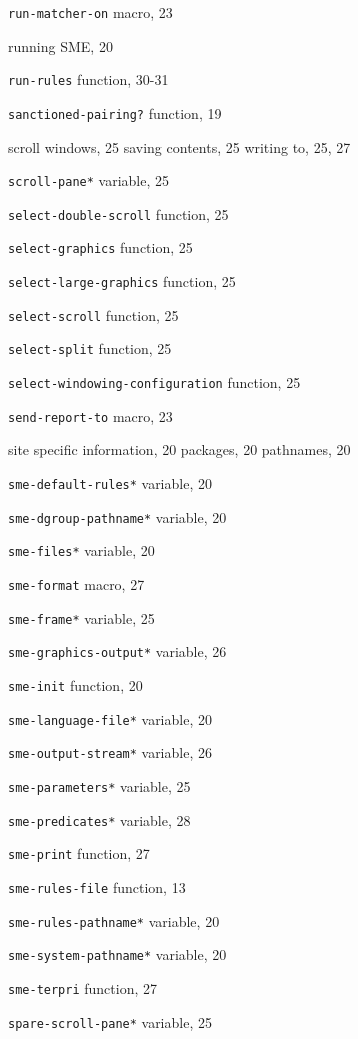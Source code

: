 \begin{theindex}
\item {\tt run-matcher-on} macro, 23
\item running SME, 20
\item {\tt run-rules} function, 30-31
\indexspace
\item {\tt sanctioned-pairing?} function, 19
\item scroll windows, 25
	\subitem  saving contents, 25
	\subitem  writing to, 25, 27
\item {\tt *scroll-pane*} variable, 25
\item {\tt select-double-scroll} function, 25
\item {\tt select-graphics} function, 25
\item {\tt select-large-graphics} function, 25
\item {\tt select-scroll} function, 25
\item {\tt select-split} function, 25
\item {\tt select-windowing-configuration} function, 25
\item {\tt send-report-to} macro, 23
\item site specific information, 20
	\subitem  packages, 20
	\subitem  pathnames, 20
\item {\tt *sme-default-rules*} variable, 20
\item {\tt *sme-dgroup-pathname*} variable, 20
\item {\tt *sme-files*} variable, 20
\item {\tt sme-format} macro, 27
\item {\tt *sme-frame*} variable, 25
\item {\tt *sme-graphics-output*} variable, 26
\item {\tt sme-init} function, 20
\item {\tt *sme-language-file*} variable, 20
\item {\tt *sme-output-stream*} variable, 26
\item {\tt *sme-parameters*} variable, 25
\item {\tt *sme-predicates*} variable, 28
\item {\tt sme-print} function, 27
\item {\tt sme-rules-file} function, 13
\item {\tt *sme-rules-pathname*} variable, 20
\item {\tt *sme-system-pathname*} variable, 20
\item {\tt sme-terpri} function, 27
\item {\tt *spare-scroll-pane*} variable, 25

\end{theindex}
